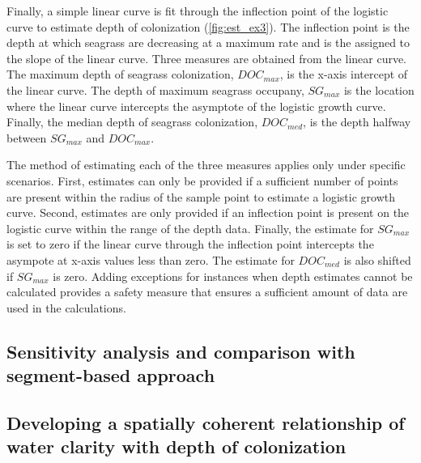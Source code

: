 \documentclass[letterpaper,12pt]{article}\usepackage[]{graphicx}\usepackage[]{color}
\begin{document}
Finally, a simple linear curve is fit through the inflection point of the logistic curve to estimate depth of colonization (\cref{fig:est_ex3}).  The inflection point is the depth at which seagrass are decreasing at a maximum rate and is the assigned to the slope of the linear curve.  Three measures are obtained from the linear curve. The maximum depth of seagrass colonization, $DOC_{max}$, is the x-axis intercept of the linear curve.  The depth of maximum seagrass occupany, $SG_{max}$ is the location where the linear curve intercepts the asymptote of the logistic growth curve.  Finally, the median depth of seagrass colonization, $DOC_{med}$, is the depth halfway between $SG_{max}$ and $DOC_{max}$.  

The method of estimating each of the three measures applies only under specific scenarios.  First, estimates can only be provided if a sufficient number of points are present within the radius of the sample point to estimate a logistic growth curve.  Second, estimates are only provided if an inflection point is present on the logistic curve within the range of the depth data.  Finally, the estimate for $SG_{max}$ is set to zero if the linear curve through the inflection point intercepts the asympote at x-axis values less than zero.  The estimate for $DOC_{med}$ is also shifted if $SG_{max}$ is zero.  Adding exceptions for instances when depth estimates cannot be calculated provides a safety measure that ensures a sufficient amount of data are used in the calculations.  

\subsection{Sensitivity analysis and comparison with segment-based approach}

\subsection{Developing a spatially coherent relationship of water clarity with depth of colonization}

\clearpage
\end{document}

